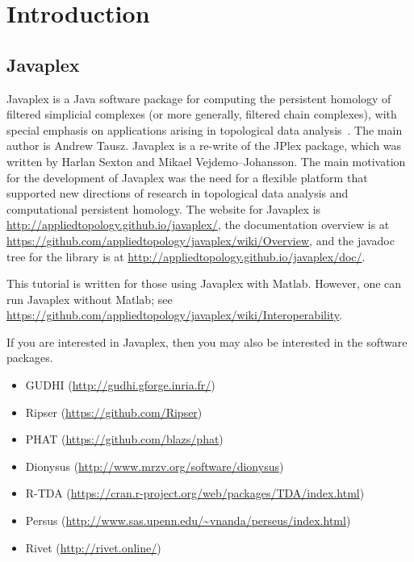 \documentclass[amscd, amssymb, verbatim]{amsart}[12pt]
\theoremstyle{remark}
\theoremstyle{remark}
\theoremstyle{remark}
\begin{document}




\section{Introduction}


\subsection{Javaplex}

Javaplex is a Java software package for computing the persistent homology of filtered simplicial complexes (or more generally, filtered chain complexes), with special emphasis on applications arising in topological data analysis~\citep{Javaplex}. The main author is Andrew Tausz. Javaplex is a re-write of the JPlex package, which was written by Harlan Sexton and Mikael Vejdemo--Johansson. The main motivation for the development of Javaplex was the need for a flexible platform that supported new directions of research in topological data analysis and computational persistent homology. The website for Javaplex is \url{http://appliedtopology.github.io/javaplex/}, the documentation overview is at \url{https://github.com/appliedtopology/javaplex/wiki/Overview}, and the javadoc tree for the library is at \url{http://appliedtopology.github.io/javaplex/doc/}.

This tutorial is written for those using Javaplex with Matlab. However, one can run Javaplex without Matlab; see \url{https://github.com/appliedtopology/javaplex/wiki/Interoperability}.

If you are interested in Javaplex, then you may also be interested in the software packages.
\begin{itemize}
\item GUDHI (\url{http://gudhi.gforge.inria.fr/})
\item Ripser (\url{https://github.com/Ripser})
\item PHAT (\url{https://github.com/blazs/phat})
\item Dionysus (\url{http://www.mrzv.org/software/dionysus})
\item R-TDA (\url{https://cran.r-project.org/web/packages/TDA/index.html})
\item Persus (\url{http://www.sas.upenn.edu/~vnanda/perseus/index.html})
\item Rivet (\url{http://rivet.online/})
\end{itemize}
\end{document}
